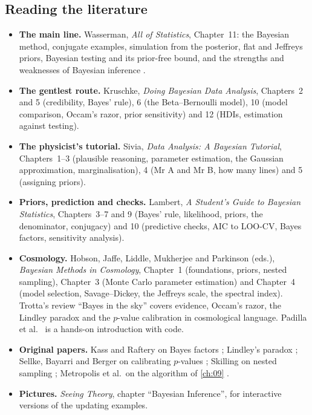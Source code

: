 \subsection*{Reading the literature}
\label{5c:sec:reading-list}

\begin{itemize}[itemsep=2pt,leftmargin=1.2em]
  \item \textbf{The main line.} Wasserman, \emph{All of Statistics}, Chapter~11: the
        Bayesian method, conjugate examples, simulation from the posterior, flat and
        Jeffreys priors, Bayesian testing and its prior-free bound, and the strengths and
        weaknesses of Bayesian inference .
  \item \textbf{The gentlest route.} Kruschke, \emph{Doing Bayesian Data Analysis},
        Chapters~2 and 5 (credibility, Bayes' rule), 6 (the Beta--Bernoulli model), 10 (model
        comparison, Occam's razor, prior sensitivity) and 12 (HDIs, estimation against
        testing).
  \item \textbf{The physicist's tutorial.} Sivia, \emph{Data Analysis: A Bayesian
        Tutorial}, Chapters~1--3 (plausible reasoning, parameter estimation, the Gaussian
        approximation, marginalisation), 4 (Mr A and Mr B, how many lines) and 5
        (assigning priors).
  \item \textbf{Priors, prediction and checks.} Lambert, \emph{A Student's Guide to
        Bayesian Statistics}, Chapters~3--7 and 9 (Bayes' rule, likelihood, priors, the
        denominator, conjugacy) and 10 (predictive checks, AIC to LOO-CV, Bayes factors,
        sensitivity analysis).
  \item \textbf{Cosmology.} Hobson, Jaffe, Liddle, Mukherjee and Parkinson (eds.),
        \emph{Bayesian Methods in Cosmology}, Chapter~1 (foundations, priors, nested sampling),
        Chapter~3 (Monte Carlo parameter estimation) and Chapter~4 (model selection,
        Savage--Dickey, the Jeffreys scale, the spectral index). Trotta's review ``Bayes in
        the sky'' \cite{Trotta2008} covers evidence, Occam's razor, the Lindley paradox and
        the $p$-value calibration in cosmological language. Padilla et al.\ \cite{Padilla2019}
        is a hands-on introduction with code.
  \item \textbf{Original papers.} Kass and Raftery on Bayes factors \cite{KassRaftery1995};
        Lindley's paradox \cite{Lindley1957}; Sellke, Bayarri and Berger on calibrating
        $p$-values \cite{Sellke2001}; Skilling on nested sampling \cite{Skilling2006};
        Metropolis et al.\ on the algorithm of \cref{ch:09} \cite{Metropolis1953}.
  \item \textbf{Pictures.} \emph{Seeing Theory}, chapter ``Bayesian Inference'', for
        interactive versions of the updating examples.
\end{itemize}

